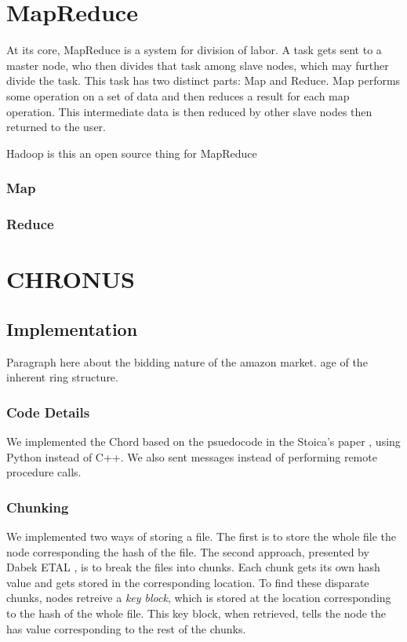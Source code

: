 \documentclass[conference, compsocconf, letterpaper]{IEEEtran}
\begin{document}
\section{MapReduce}
At its core, MapReduce \cite{mapreduce} is a system for division of labor.  A task gets sent to a master node, who then divides that task among slave nodes, which may further divide the task.  This task has two distinct parts: Map and Reduce.  Map performs some operation on a set of data and then reduces a result for each map operation.  This intermediate data is then reduced by other slave nodes then returned to the user. 


Hadoop is this an open source thing for MapReduce \cite{hadoop}

\subsubsection{Map}

\subsubsection{Reduce}


\section{CHRONUS}




\subsection{Implementation}
Paragraph here about the bidding nature of the amazon market.
age of the inherent ring structure.





\subsubsection{Code Details}
We implemented the Chord based on the psuedocode  in the Stoica's paper \cite{Chord}, using Python instead of C++.  We also sent messages instead of performing remote procedure calls.


\subsubsection{Chunking}
We implemented two ways of storing a file.  The first is to store the whole file the node 
corresponding the hash of the file.  The second approach, presented  by Dabek ETAL 
\cite{CFS}, is to break the files into chunks.  Each chunk gets its own hash value and 
gets stored in the corresponding location.  To find these disparate  chunks, nodes 
retreive a \emph{key block}, which is stored at the location corresponding to the hash of 
the whole file.  This key block, when retrieved, tells the node the has value 
corresponding to the rest of the chunks.
\end{document}
